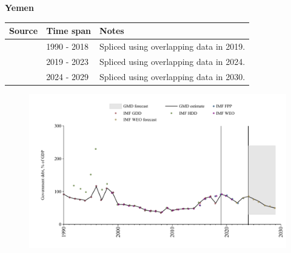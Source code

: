 \documentclass[12pt,a4paper,landscape]{article}
\begin{document}
\begin{adjustbox}{max totalsize={\paperwidth}{\paperheight},center}
\begin{minipage}[t][\textheight][t]{\textwidth}
\vspace*{0.5cm}
{}
\begin{center}
{\Large\bfseries Yemen}
\end{center}
\vspace{0.5cm}
\begin{table}[H]
\centering
\small
\begin{tabular}{|l|l|l|}
\hline
\textbf{Source} & \textbf{Time span} & \textbf{Notes} \\
\hline
\rowcolor{white}\cite{IMF_GDD}& 1990 - 2018 &Spliced using overlapping data in 2019.\\
\rowcolor{lightgray}\cite{IMF_FPP}& 2019 - 2023 &Spliced using overlapping data in 2024.\\
\rowcolor{white}\cite{IMF_WEO_forecast}& 2024 - 2029 &Spliced using overlapping data in 2030.\\
\hline
\end{tabular}
\end{table}
\begin{figure}[H]
\centering
\includegraphics[width=\textwidth,height=0.6\textheight,keepaspectratio]{graphs/YEM_govdebt_GDP.pdf}
\end{figure}
\end{minipage}
\end{adjustbox}
\end{document}
